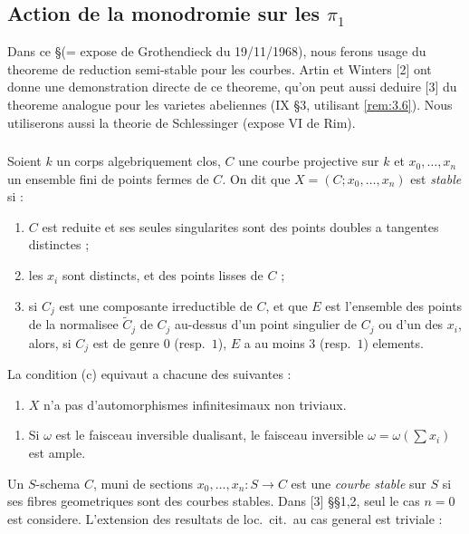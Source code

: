 \subsection{Action de la monodromie sur les $\pi_1$}
\label{subsec:action-monodromie}

Dans ce \S (= expose de Grothendieck du 19/11/1968), nous ferons usage du theoreme de reduction semi-stable pour les courbes. Artin et Winters [2] ont donne une demonstration directe de ce theoreme, qu'on peut aussi deduire [3] du theoreme analogue pour les varietes abeliennes (IX \S 3, utilisant \ref{rem:3.6}). Nous utiliserons aussi la theorie de Schlessinger (expose VI de Rim).

\subsubsection{}
\label{subsubsec:5.1}
Soient $k$ un corps algebriquement clos, $C$ une courbe projective sur $k$ et $x_0, \ldots, x_n$ un ensemble fini de points fermes de $C$. On dit que $X = (C; x_0, \ldots, x_n)$ est \emph{stable} si :
\begin{enumerate}[label=(\alph*)]
\item $C$ est reduite et ses seules singularites sont des points doubles a tangentes distinctes ;
\item les $x_i$ sont distincts, et des points lisses de $C$ ;
\item si $C_j$ est une composante irreductible de $C$, et que $E$ est l'ensemble des points de la normalisee $\tilde{C}_j$ de $C_j$ au-dessus d'un point singulier de $C_j$ ou d'un des $x_i$, alors, si $C_j$ est de genre $0$ (resp.~$1$), $E$ a au moins $3$ (resp.~$1$) elements.
\end{enumerate}

La condition (c) equivaut a chacune des suivantes :
\begin{enumerate}[label=(c')]
\item $X$ n'a pas d'automorphismes infinitesimaux non triviaux.
\end{enumerate}
\begin{enumerate}[label=(c'')]
\item Si $\omega$ est le faisceau inversible dualisant, le faisceau inversible $\omega = \omega(\sum x_i)$ est ample.
\end{enumerate}

Un $S$-schema $C$, muni de sections $x_0, \ldots, x_n : S \to C$ est une \emph{courbe stable} sur $S$ si ses fibres geometriques sont des courbes stables. Dans [3] \S\S 1,2, seul le cas $n = 0$ est considere. L'extension des resultats de loc.~cit.~au cas general est triviale :

